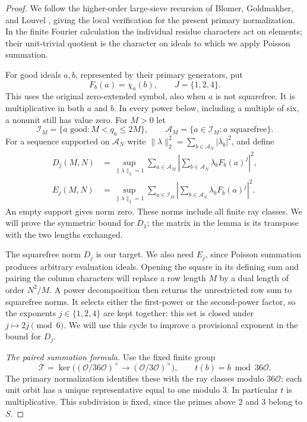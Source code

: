\documentclass[11pt,a4paper]{article}
\numberwithin{equation}{section}
\numberwithin{figure}{section}
\theoremstyle{definition}
\theoremstyle{remark}
\begin{document}
\begin{proof}
We follow the higher-order large-sieve recursion of Blomer, Goldmakher,
and Louvel \cite[Section~3]{BGL}, giving the local verification for the
present primary normalization.  In the finite Fourier calculation the
individual residue characters act on elements; their unit-trivial quotient
is the character on ideals to which we apply Poisson summation.

For good ideals $a,b$, represented by their primary generators, put
\[
 F_b(a)=\chi_a(b),\qquad J=\{1,2,4\}.
\]
This uses the original zero-extended symbol, also when $a$ is not
squarefree.  It is multiplicative in both $a$ and $b$.  In every power
below, including a multiple of six, a nonunit still has value zero.
For $M>0$ let
\[
 \mathcal I_M=\{a\text{ good}:M<q_a\le2M\},\qquad
 \mathcal A_M=\{a\in\mathcal I_M:a\text{ squarefree}\}.
\]
For a sequence supported on $\mathcal A_N$ write
$\|\lambda\|_2^2=\sum_{b\in\mathcal A_N}|\lambda_b|^2$, and define
\begin{align*}
 D_j(M,N)&=\sup_{\|\lambda\|_2=1}
  \sum_{a\in\mathcal A_M}
  \left|\sum_{b\in\mathcal A_N}\lambda_bF_b(a)^j\right|^2,\\
 E_j(M,N)&=\sup_{\|\lambda\|_2=1}
  \sum_{a\in\mathcal I_M}
  \left|\sum_{b\in\mathcal A_N}\lambda_bF_b(a)^j\right|^2.
\end{align*}
An empty support gives norm zero.  These norms include all finite ray
classes.  We will prove the symmetric bound for $D_1$; the matrix in the
lemma is its transpose with the two lengths exchanged.

The squarefree norm $D_j$ is our target.  We also need $E_j$, since
Poisson summation produces arbitrary evaluation ideals.  Opening the square in its defining sum
and pairing the column characters will replace a row length $M$ by a dual
length of order $N^2/M$.  A power decomposition then returns the unrestricted
row sum to squarefree norms.  It selects either the first-power or the
second-power factor, so the exponents $j\in\{1,2,4\}$ are kept together:
this set is closed under $j\mapsto2j\pmod6$.  We will use this cycle to
improve a provisional exponent in the bound for $D_j$.

\medskip\noindent\emph{The paired summation formula.}
Use the fixed finite group
\[
 \mathcal T=\ker\bigl((\mathcal O/36\mathcal O)^\times
              \longrightarrow(\mathcal O/3\mathcal O)^\times\bigr),
 \qquad t(b)=b\bmod36\mathcal O.
\]
The primary normalization identifies these with the ray classes modulo
$36\mathcal O$: each unit orbit has a unique representative equal to one
modulo $3$.  In particular $t$ is multiplicative.  This subdivision is
fixed, since the primes above $2$ and $3$ belong to $S$.


\end{proof}
\end{document}
